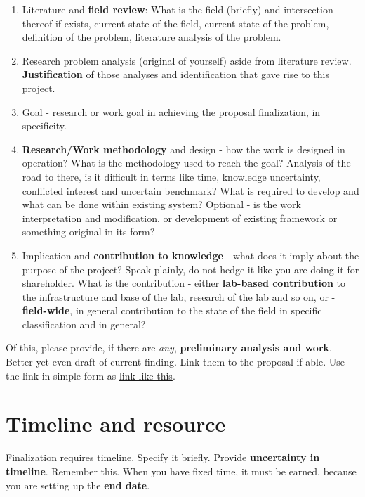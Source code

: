\documentclass[10pt,a4paper]{article}
\begin{document}
\begin{enumerate}
    \item Literature and \textbf{field review}: What is the field (briefly) and intersection thereof if exists, current state of the field, current state of the problem, definition of the problem, literature analysis of the problem. 
    \item Research problem analysis (original of yourself) aside from literature review. \textbf{Justification} of those analyses and identification that gave rise to this project. 
    \item Goal - research or work goal in achieving the proposal finalization, in specificity. 
    \item \textbf{Research/Work methodology} and design - how the work is designed in operation? What is the methodology used to reach the goal? Analysis of the road to there, is it difficult in terms like time, knowledge uncertainty, conflicted interest and uncertain benchmark? What is required to develop and what can be done within existing system? Optional - is the work interpretation and modification, or development of existing framework or something original in its form?
    \item Implication and \textbf{contribution to knowledge} - what does it imply about the purpose of the project? Speak plainly, do not hedge it like you are doing it for shareholder. What is the contribution - either \textbf{lab-based contribution} to the infrastructure and base of the lab, research of the lab and so on, or - \textbf{field-wide}, in general contribution to the state of the field in specific classification and in general?
\end{enumerate}

Of this, please provide, if there are \textit{any}, \textbf{preliminary analysis and work}. Better yet even draft of current finding. Link them to the proposal if able. Use the link in simple form as \href{https://rhinelab-main-4457ca.gitlab.io/contents/actions/research/laboratory/theoretical_AI.html}{link like this}. 

\section*{Timeline and resource}
\label{sec:conc}

Finalization requires timeline. Specify it briefly. Provide \textbf{uncertainty in timeline}. Remember this. When you have fixed time, it must be earned, because you are setting up the \textbf{end date}. 
\end{document}
